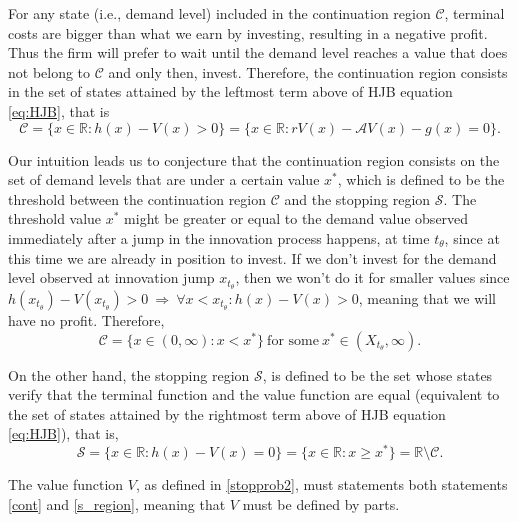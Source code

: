 For any state (i.e., demand level) included in the continuation region $\mathcal{C}$, terminal costs are bigger than what we earn by investing, resulting in a negative profit. Thus the firm will prefer to wait until the demand level reaches a value that does not belong to $\mathcal{C}$ and only then, invest. Therefore, the continuation region consists in the set of states attained by the leftmost term above of HJB equation \eqref{eq:HJB}, that is
\begin{equation*}
\mathcal{C}=\{ x \in \mathds{R}: h(x)-V(x)>0 \}=\{ x \in \mathds{R}: rV(x)- \mathcal{A}V(x)-g(x)=0 \}.
\label{cont}
\end{equation*}

Our intuition leads us to conjecture that the continuation region consists on the set of demand levels that are under a certain value $x^*$, which is defined to be the threshold between the continuation region $\mathcal{C}$ and the stopping region $\mathcal{S}$. The threshold value $x^*$ might be greater or equal to the demand value observed immediately after a jump in the innovation process happens, at time $t_\theta$, since at this time we are already in position to invest. If we don't invest for the demand level observed at innovation jump  $x_{t_\theta}$, then we won't do it for smaller values since
$h(x_{t_\theta})-V(x_{t_\theta})>0\ \Rightarrow \ \forall x<x_{t_\theta}: h(x)-V(x)>0$, meaning that we will have no profit. Therefore,
\begin{equation}
	\mathcal{C} = \{ x \in (0, \infty): x<x^* \} \ \text{for some} \ x^* \in 
	(X_{t_\theta}, \infty).
	\label{c_region}
\end{equation}

On the other hand, the stopping region $\mathcal{S}$, is defined to be the set whose states verify that the terminal function and the value function are equal (equivalent to the set of states attained by the rightmost term above of HJB equation \eqref{eq:HJB}), that is,
\begin{equation}
\mathcal{S}=\{ x \in \mathds{R}: h(x)-V(x)=0 \}= \{ x \in \mathds{R}: x\geq x^* \}= \mathds{R} \setminus \mathcal{C}.
\label{s_region}
\end{equation}

The value function $V$, as defined in \eqref{stopprob2}, must statements both statements \eqref{cont} and \eqref{s_region}, meaning that $V$ must be defined by parts.

